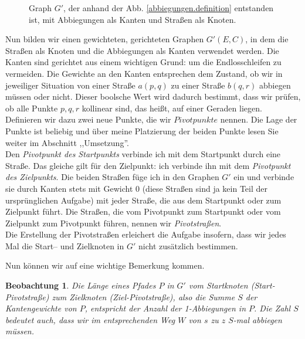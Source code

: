 \documentclass[a4paper,10pt,ngerman]{scrartcl}
\newtheorem{lemma}{Beobachtung}
\begin{document}
\begin{figure}[h] \centerline {
} 
\caption{Graph $G'$, der anhand der Abb. \ref{abbiegungen.definition} entstanden ist,
mit Abbiegungen als Kanten und Straßen als Knoten.}
\label{abbiegungen.definition2}
\end{figure}

Nun bilden wir einen gewichteten, gerichteten Graphen $G'(E, C)$, in dem die Straßen als Knoten
und die Abbiegungen als Kanten verwendet werden. Die Kanten sind gerichtet aus einem wichtigen Grund:
um die Endlosschleifen zu vermeiden. Die Gewichte an den Kanten entsprechen dem Zustand,
ob wir in jeweiliger Situation von einer Straße $a(p,q)$ zu einer Straße $b(q,r)$ abbiegen müssen oder nicht.
Dieser boolsche Wert wird dadurch bestimmt, dass wir prüfen, ob alle Punkte $p,q,r$ kollinear sind,
das heißt, auf einer Geraden liegen.\\

Definieren wir dazu zwei neue Punkte, die wir $Pivotpunkte$ nennen.
Die Lage der Punkte ist beliebig und über meine Platzierung der beiden Punkte lesen Sie weiter
im Abschnitt ,,Umsetzung''.\\
Den \textit{Pivotpunkt des Startpunkts} verbinde ich mit dem Startpunkt durch eine Straße.
Das gleiche gilt für den Zielpunkt: ich verbinde ihn mit dem \textit{Pivotpunkt des Zielpunkts}.
Die beiden Straßen füge ich in den Graphen $G'$ ein und verbinde sie durch Kanten stets mit Gewicht 0
(diese Straßen sind ja kein Teil der ursprünglichen Aufgabe) mit jeder Straße,
die aus dem Startpunkt oder zum Zielpunkt führt. Die Straßen, die vom Pivotpunkt zum Startpunkt oder
vom Zielpunkt zum Pivotpunkt führen, nennen wir \textit{Pivotstraßen}.\\
Die Erstellung der Pivotstraßen erleichert die Aufgabe insofern,
dass wir jedes Mal die Start-- und Zielknoten in $G'$ nicht zusätzlich bestimmen.

Nun können wir auf eine wichtige Bemerkung kommen. 
\begin{lemma}
\label{dlugoscdrogiG'}
Die Länge eines Pfades
$P$ in $G'$ vom Startknoten (Start-Pivotstraße) zum Zielknoten (Ziel-Pivotstraße),
also die Summe $S$ der Kantengewichte von $P$, entspricht der Anzahl der 1-Abbiegungen in $P$.
Die Zahl $S$ bedeutet auch, dass wir im entsprechenden Weg $W$ von $s$ zu $z$ $S$-mal abbiegen müssen.
\end{lemma}
\end{document}
